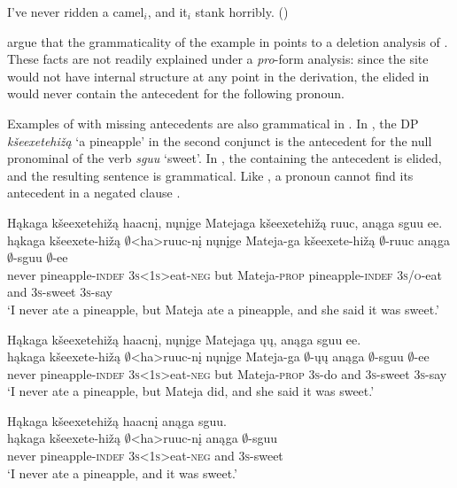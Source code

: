 \documentclass[output=paper]{LSP/langsci}
\begin{document}
{{\ea\label{ex:johnson:50}
I've never ridden a camel$_i$, and it$_i$ stank horribly. (\citealt[404]{HankamerSag1976})
\z 

\citet{HankamerSag1976} argue that the grammaticality of the example in  points to a deletion analysis of . These facts are not readily explained under a \emph{pro}-form analysis: since the  site would not have internal structure at any point in the derivation, the elided  in  would never contain the antecedent for the following pronoun. 

Examples of  with missing antecedents are also grammatical in . In , the DP \emph{kšeexetehižą} `a pineapple' in the second conjunct is the antecedent for the null pronominal  of the verb \emph{sguu} `sweet'. In , the  containing the antecedent is elided, and the resulting sentence is grammatical. Like , a pronoun cannot find its antecedent in a negated clause .
 
\ea
\ea\label{ex:johnson:51a} 
\glll Hąkaga kšeexetehižą haacnį, nųnįge Matejaga kšeexetehižą ruuc, anąga sguu ee.\\
hąkaga kšeexete-hižą $\emptyset$<ha>ruuc-nį nųnįge Mateja-ga kšeexete-hižą $\emptyset$-ruuc anąga $\emptyset$-sguu $\emptyset$-ee\\
never pineapple-\textsc{indef} \textsc{3s<1s>}eat-\textsc{neg} but Mateja-\textsc{prop} pineapple-\textsc{indef} \textsc{3s/o}-eat and \textsc{3s}-sweet \textsc{3s}-say\\
\trans `I never ate a pineapple, but Mateja ate a pineapple, and she said it was sweet.'
 
\ex\label{ex:johnson:51b} 
\glll Hąkaga kšeexetehižą haacnį, nųnįge Matejaga ųų, anąga sguu ee.\\
hąkaga kšeexete-hižą $\emptyset$<ha>ruuc-nį nųnįge Mateja-ga $\emptyset$-ųų anąga $\emptyset$-sguu $\emptyset$-ee\\
never pineapple-\textsc{indef} \textsc{3s<1s>}eat-\textsc{neg} but Mateja-\textsc{prop} \textsc{3s}-do and \textsc{3s}-sweet \textsc{3s}-say\\
\trans `I never ate a pineapple, but Mateja did, and she said it was sweet.'
\z
\z
 
\ea\label{ex:johnson:52} 
\glll Hąkaga kšeexetehižą haacnį anąga sguu.\\
hąkaga kšeexete-hižą $\emptyset$<ha>ruuc-nį anąga $\emptyset$-sguu\\
never pineapple-\textsc{indef} \textsc{3s<1s>}eat-\textsc{neg} and \textsc{3s}-sweet\\
\trans `I never ate a pineapple, and it was sweet.'
\z


}}
\end{document}
